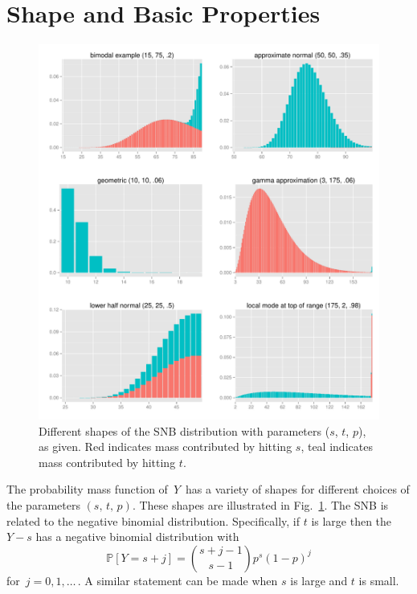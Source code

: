 \documentclass[review]{elsarticle}
\begin{document}
\section{Shape and Basic Properties}

\begin{figure}[p!]
\begin{center}
\includegraphics[width=\textwidth]{shapes.pdf}
\end{center}
\caption{Different shapes of the SNB distribution with parameters ($s$, $t$, $p$), as given. Red indicates mass contributed by hitting $s$, teal indicates
mass contributed by hitting $t$. \label{shapes.fig}}
\end{figure}

The probability mass function of $\,Y\,$ has a variety of shapes for different 
choices of the parameters $(s,\, t,\,p)$.  These shapes are illustrated in 
Fig.~\ref{shapes.fig}. The SNB is related to the negative binomial 
distribution. Specifically, if $t$ is large then the $Y-s$ has a negative 
binomial distribution with
\begin{equation*}                                    %
\mathbb{P}[Y=s+j]        \label{nb1.eq}          
  = {{s+j-1}\choose{s-1}} p^s (1-p)^j
\end{equation*}
for $\,j=0, 1,\ldots\,$. A similar statement can be made when $s$ is large
and $t$ is small.
\end{document}
